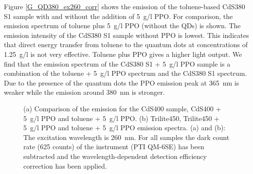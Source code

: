 \documentclass[cits]{JINST}
\begin{document}
Figure \ref{G_QD380_ex260_corr} shows the emission of the toluene-based CdS380 S1 sample with and without the addition of 5~g/l PPO. For comparison, the emission spectrum of toluene plus 5~g/l PPO (without the QDs) is shown. The emission intensity of the CdS380 S1 sample without PPO is lowest. This indicates that direct energy transfer from toluene to the quantum dots at concentrations of 1.25~g/l is not very effective. Toluene plus PPO gives a higher light output. We find that the emission spectrum of the CdS380 S1 + 5~g/l PPO sample is a combination of the toluene + 5~g/l PPO spectrum and the CdS380 S1 spectrum. Due to the presence of the quantum dots the PPO emission peak at 365~nm is weaker while the emission around 380~nm is stronger.  

\begin{figure}
      \begin{center}
\caption[]{(a) Comparison of the emission for the CdS400 sample, CdS400 + 5~g/l PPO and toluene + 5~g/l PPO. (b) Trilite450, Trilite450 + 5~g/l PPO and toluene + 5~g/l PPO emission spectra. (a) and (b): The excitation wavelength is 260~nm. For all samples the dark count rate (625 counts) of the instrument (PTI QM-6SE) has been subtracted and the wavelength-dependent detection efficiency correction has been applied. \label{G_QD400_QD450_ex260_corr}}
        \end{center}
\end{figure}
\end{document}
